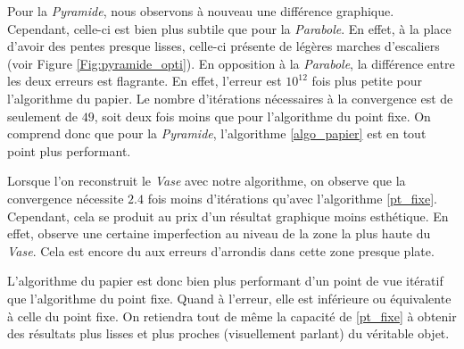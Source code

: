 Pour la \textit{Pyramide}, nous observons à nouveau une différence graphique. Cependant, celle-ci est bien plus subtile que pour la \textit{Parabole}. En effet, à la place d'avoir des pentes presque lisses, celle-ci présente de légères \og marches d'escaliers \fg{} (voir Figure \ref{Fig:pyramide_opti}). En opposition à la \textit{Parabole}, la différence entre les deux erreurs est flagrante. En effet, l'erreur est $10^{12}$ fois plus petite pour l'algorithme du papier. Le nombre d'itérations nécessaires à la convergence est de seulement de $49$, soit deux fois moins que pour l'algorithme du point fixe. On comprend donc que pour la \textit{Pyramide}, l'algorithme \eqref{algo_papier} est en tout point plus performant.

Lorsque l'on reconstruit le \textit{Vase} avec notre algorithme, on observe que la convergence nécessite $2.4$ fois moins d'itérations qu'avec l'algorithme \eqref{pt_fixe}. Cependant, cela se produit au prix d'un résultat graphique moins esthétique. En effet, observe une certaine imperfection au niveau de la zone la plus haute du \textit{Vase}. Cela est encore du aux erreurs d'arrondis dans cette zone presque plate.

L'algorithme du papier est donc bien plus performant d'un point de vue itératif que l'algorithme du point fixe. Quand à l'erreur, elle est inférieure ou équivalente à celle du point fixe. On retiendra tout de même la capacité de \eqref{pt_fixe} à obtenir des résultats plus lisses et plus proches (visuellement parlant) du véritable objet.\\

